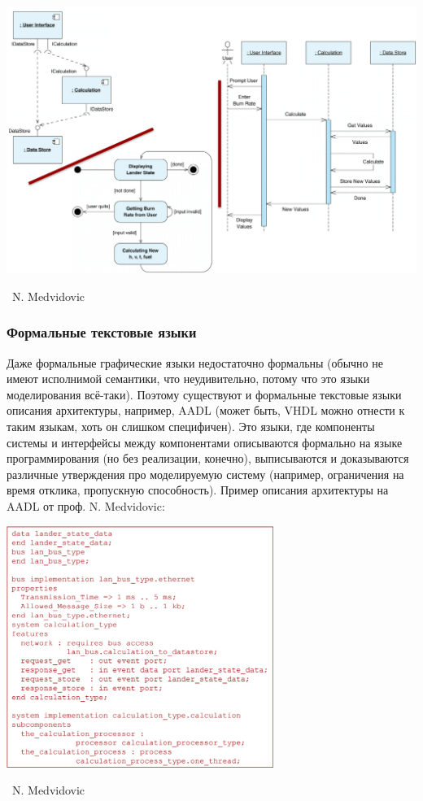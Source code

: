 \documentclass[a5paper]{article}
\newcommand{\attribution}[1] {
    \vspace{-5mm}\begin{flushright}\begin{scriptsize}%
    {\textcopyright\, #1}\end{scriptsize}\end{flushright}
}
\begin{document}
\begin{center}
    \includegraphics[width=\textwidth]{uml.png}
    \attribution{N. Medvidovic}
\end{center}

\subsubsection{Формальные текстовые языки}

Даже формальные графические языки недостаточно формальны (обычно не имеют исполнимой семантики, что неудивительно, потому что это языки моделирования всё-таки). Поэтому существуют и формальные текстовые языки описания архитектуры, например, AADL (может быть, VHDL можно отнести к таким языкам, хоть он слишком специфичен). Это языки, где компоненты системы и интерфейсы между компонентами описываются формально на языке программирования (но без реализации, конечно), выписываются и доказываются различные утверждения про моделируемую систему (например, ограничения на время отклика, пропускную способность). Пример описания архитектуры на AADL от проф. N. Medvidovic:

\begin{center}
    \includegraphics[width=0.65\textwidth]{aadl.png}
    \attribution{N. Medvidovic}
\end{center}
\end{document}
